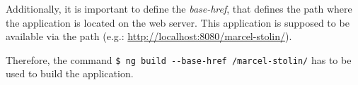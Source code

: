 Additionally, it is important to define the \textit{base-href}, that defines the path where the application is located on the web server. This application is supposed to be available via the path  (e.g.: \url{http://localhost:8080/marcel-stolin/}).


Therefore, the command \texttt{\$ ng build -{}-base-href /marcel-stolin/} has to be used to build the application.
